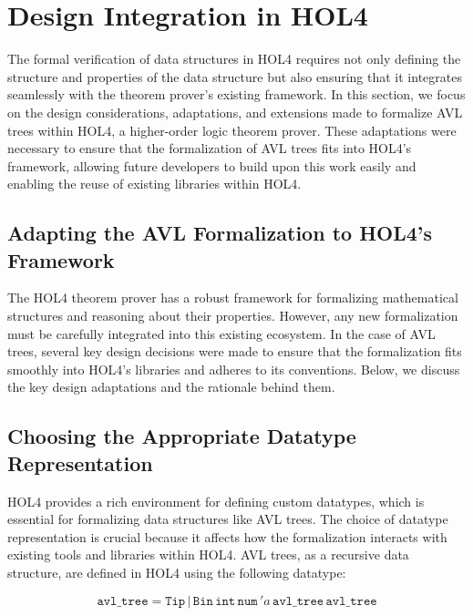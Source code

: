 \chapter{Design Integration in HOL4}\label{chap:LaTeXAdvice}

The formal verification of data structures in HOL4 requires not only defining the structure and properties of the data structure but also ensuring that it integrates seamlessly with the theorem prover's existing framework. In this section, we focus on the design considerations, adaptations, and extensions made to formalize AVL trees within HOL4, a higher-order logic theorem prover. These adaptations were necessary to ensure that the formalization of AVL trees fits into HOL4’s framework, allowing future developers to build upon this work easily and enabling the reuse of existing libraries within HOL4.

\section{Adapting the AVL Formalization to HOL4’s Framework}

The HOL4 theorem prover has a robust framework for formalizing mathematical structures and reasoning about their properties. However, any new formalization must be carefully integrated into this existing ecosystem. In the case of AVL trees, several key design decisions were made to ensure that the formalization fits smoothly into HOL4’s libraries and adheres to its conventions. Below, we discuss the key design adaptations and the rationale behind them.


\section{Choosing the Appropriate Datatype Representation}

HOL4 provides a rich environment for defining custom datatypes, which is essential for formalizing data structures like AVL trees. The choice of datatype representation is crucial because it affects how the formalization interacts with existing tools and libraries within HOL4. AVL trees, as a recursive data structure, are defined in HOL4 using the following datatype:

\[
\texttt{avl\_tree} = \texttt{Tip} \, | \, \texttt{Bin} \, \texttt{int} \, \texttt{num} \, 'a \, \texttt{avl\_tree} \, \texttt{avl\_tree}
\]


